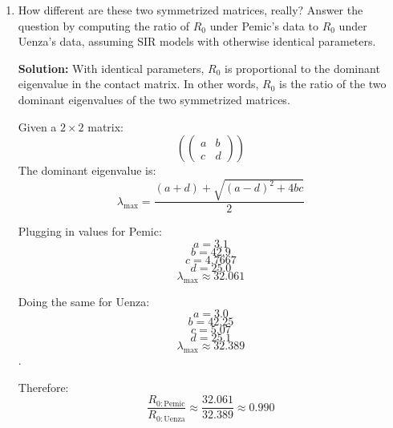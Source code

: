 \documentclass[11pt]{article}
\newenvironment{solution}{\par\noindent\begingroup\color{BrickRed}\textbf{Solution:} }{\par\endgroup}
\begin{document}
\begin{enumerate}
\begin{enumerate}[label=\alph*.]
\begin{solution}
Keep diagonals unchanged.

Pemic: \\
$$A=\frac{200\cdot 43.5 + 1800\cdot 4.7}{2}=\frac{8700+8460}{2}=8580$$
Then: 
$$c'_{F\to S}=\frac{8580}{200}=42.9$$
$$c'_{S\to F}=\frac{8580}{1800}=4.766\overline{6}$$

$$
C^\text{sym}_\text{Pemic}=
\begin{pmatrix}
3.1 & 42.9 \\
4.7667 & 25.0
\end{pmatrix}
$$

Uenza: \\
$$A=\frac{210\cdot 44.5 + 1750\cdot 4.8}{2}=\frac{9345+8400}{2}=8872.5$$
Then:
$$c'_{F\to S}=\frac{8872.5}{210}=42.25$$ 
$$c'_{S\to F}=\frac{8872.5}{1750}=5.07$$

$$
C^\text{sym}_\text{Uenza}=
\begin{pmatrix}
3.0 & 42.25 \\
5.07 & 25.1
\end{pmatrix}
$$

These now are the symmetrized contact matrices.
\end{solution}

\item How different are these two symmetrized matrices, really?
Answer the question by computing the ratio of $R_0$ under Pemic's data to $R_0$ under Uenza's data,
assuming SIR models with otherwise identical parameters.

\begin{solution}
With identical parameters,
$R_0$ is proportional to the dominant eigenvalue in the contact matrix.
In other words, $R_0$ is the ratio of the two dominant eigenvalues of the two symmetrized matrices.

Given a $2\times 2$ matrix:
$$\left(\begin{pmatrix}a & b \\ c & d\end{pmatrix}\right)$$
The dominant eigenvalue is:
$$\lambda_{\max}=\frac{(a+d)+\sqrt{(a-d)^2+4bc}}{2}$$

Plugging in values for Pemic:
$$a{=}3.1$$ $$b{=}42.9$$ $$c{=}4.7667$$ $$d{=}25.0$$
$$\lambda_{\max}\approx 32.061$$

Doing the same for Uenza:
$$a{=}3.0$$ $$b{=}42.25$$ $$c{=}5.07$$ $$d{=}25.1$$
$$\lambda_{\max}\approx 32.389$$.

Therefore:
$$\dfrac{R_{0:\text{Pemic}}}{R_{0:\text{Uenza}}}\approx \dfrac{32.061}{32.389}\approx 0.990$$


\end{solution}
\end{enumerate}
\end{enumerate}
\end{document}
